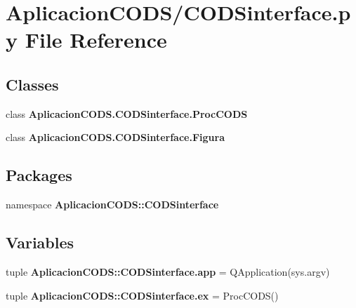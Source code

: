 \section{\-Aplicacion\-C\-O\-D\-S/\-C\-O\-D\-Sinterface.py \-File \-Reference}
\label{_c_o_d_sinterface_8py}
\subsection*{\-Classes}
\begin{DoxyCompactItemize}
\item 
class {\bf \-Aplicacion\-C\-O\-D\-S.\-C\-O\-D\-Sinterface.\-Proc\-C\-O\-D\-S}
\item 
class {\bf \-Aplicacion\-C\-O\-D\-S.\-C\-O\-D\-Sinterface.\-Figura}
\end{DoxyCompactItemize}
\subsection*{\-Packages}
\begin{DoxyCompactItemize}
\item 
namespace {\bf \-Aplicacion\-C\-O\-D\-S\-::\-C\-O\-D\-Sinterface}
\end{DoxyCompactItemize}
\subsection*{\-Variables}
\begin{DoxyCompactItemize}
\item 
tuple {\bf \-Aplicacion\-C\-O\-D\-S\-::\-C\-O\-D\-Sinterface.\-app} = \-Q\-Application(sys.\-argv)
\item 
tuple {\bf \-Aplicacion\-C\-O\-D\-S\-::\-C\-O\-D\-Sinterface.\-ex} = \-Proc\-C\-O\-D\-S()
\end{DoxyCompactItemize}
